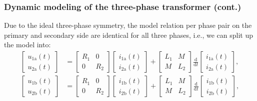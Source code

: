 \begin{frame}
	\frametitle{Dynamic modeling of the three-phase transformer (cont.)}
	Due to the ideal three-phase symmetry, the model relation per phase pair on the primary and secondary side are identical for all three phases, i.e., we can split up the model into:  
	\begin{align}
		\begin{bmatrix}	u_\mathrm{1a}(t)\\u_\mathrm{2a}(t) \end{bmatrix} &= \begin{bmatrix} R_1 & 0 \\ 0 & R_2 \end{bmatrix} \begin{bmatrix} i_\mathrm{1a}(t)\\i_\mathrm{2a}(t) \end{bmatrix} + \begin{bmatrix} L_1 & M \\ M & L_2 \end{bmatrix} \frac{\mathrm{d}}{\mathrm{d}t} \begin{bmatrix} i_\mathrm{1a}(t)\\i_\mathrm{2a}(t) \end{bmatrix}, \\   
		\begin{bmatrix}	u_\mathrm{1b}(t)\\u_\mathrm{2b}(t) \end{bmatrix} &= \begin{bmatrix} R_1 & 0 \\ 0 & R_2 \end{bmatrix} \begin{bmatrix} i_\mathrm{1b}(t)\\i_\mathrm{2b}(t) \end{bmatrix} + \begin{bmatrix} L_1 & M \\ M & L_2 \end{bmatrix} \frac{\mathrm{d}}{\mathrm{d}t} \begin{bmatrix} i_\mathrm{1b}(t)\\i_\mathrm{2b}(t) \end{bmatrix},\\

\end{align}
\end{frame}
